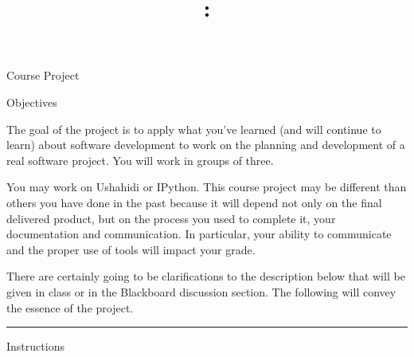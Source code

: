 \documentclass[letterpaper]{article}
\title{\course{}: \activity{}}
\date{}
\newcommand{\activity}{Course Project}
\newcommand{\horizrule}{\noindent\rule{\linewidth}{0.15mm}}
\begin{document}
\reversemarginpar

\begin{center}
  \Large{\activity{}}
\end{center}

\begin{center}
  \large{Objectives}
\end{center}

The goal of the project is to apply what you've learned (and will continue to
learn) about software development to work
on the planning and development of a real software project.
You will work in groups of three.

You may work on Ushahidi or IPython.  This course project may be different
than others you have done in the past because it will depend not only on the
final delivered product, but on the process you used to complete it, your
documentation and communication.  In particular, your ability to communicate
and the proper use of tools will impact your grade.

There are certainly going to be clarifications to the description below that
will be given in class or in the Blackboard discussion section.  The following
will convey the essence of the project.
\horizrule

\begin{center}
  \large{Instructions}
\end{center}

\end{document}
